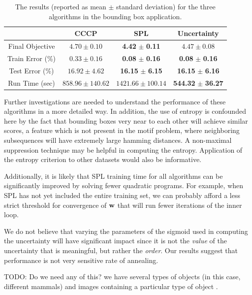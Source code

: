 \documentclass{article}
\begin{document}
\begin{table}
\caption{The results (reported as mean $\pm$ standard deviation) for the three algorithms in the bounding box application. }
\begin{center}
\begin{tabular}{|c|c|c|c|}
\hline  & CCCP & SPL & Uncertainty \\\hline
Final Objective & $4.70 \pm 0.10$ & \textbf{4.42} $\pm$ \textbf{0.11} & $4.47 \pm 0.08$ \\\hline
Train Error (\%) & $0.33 \pm 0.16$ & \textbf{0.08} $\pm$ \textbf{0.16} & \textbf{0.08} $\pm$ \textbf{0.16}  \\ \hline
Test Error (\%) & $16.92 \pm 4.62$ & \textbf{16.15} $\pm$ \textbf{6.15} & \textbf{16.15} $\pm$ \textbf{6.16} \\ \hline
Run Time (sec) & $858.96 \pm 140.62$ & $1421.66 \pm 100.14$ & \textbf{544.32} $\pm$ \textbf{36.27} \\ \hline
\end{tabular}
\end{center}
\label{tbl:bbox}
\end{table}

Further investigations are needed to understand the performance of these algorithms in a more detailed way.  In addition, the use of entropy is confounded here by the fact that bounding boxes very near to each other will achieve similar scores, a feature which is not present in the motif problem, where neighboring subsequences will have extremely large hamming distances.  A non-maximal suppression technique may be helpful in computing the entropy.  Application of the entropy criterion to other datasets would also be informative.

Additionally, it is likely that SPL training time for all algorithms can be significantly improved by solving fewer quadratic programs.  For example, when SPL has not yet included the entire training set, we can probably afford a less strict threshold for convergence of $\bf w$ that will run fewer iterations of the inner loop.

We do not believe that varying the parameters of the sigmoid used in computing the uncertainty will have significant impact since it is not the \emph{value} of the uncertainty that is meaningful, but rather the \emph{order}.  Our results suggest that performance is not very sensitive rate of annealing.


TODO: Do we need any of this?
we have several types of objects (in this case, different mammals) and 
 images containing a particular type of object .
\end{document}
